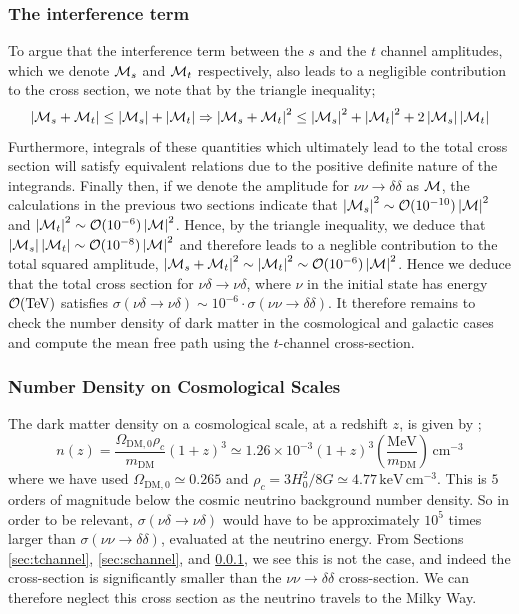 \subsubsection{The interference term}\label{sec:interference}
To argue that the interference term between the $s$ and the $t$ channel amplitudes, which we denote $\mathcal{M}_s$ and $\mathcal{M}_t$ respectively, also leads to a negligible contribution to the cross section, we note that by the triangle inequality;
\begin{equation}
    \left|\mathcal{M}_s + \mathcal{M}_t\right| \leq \left|\mathcal{M}_s\right| + \left|\mathcal{M}_t\right| \Rightarrow \left|\mathcal{M}_s + \mathcal{M}_t\right|^2 \leq \left|\mathcal{M}_s\right|^2 + \left|\mathcal{M}_t\right|^2 + 2\left|\mathcal{M}_s\right|\left|\mathcal{M}_t\right|
\end{equation}
Furthermore, integrals of these quantities which ultimately lead to the total cross section will satisfy equivalent relations due to the positive definite nature of the integrands. Finally then, if we denote the amplitude for $\nu\nu \rightarrow \delta\delta$ as $\mathcal{M}$, the calculations in the previous two sections indicate that $\left|\mathcal{M}_s\right|^2 \sim \mathcal{O}(10^{-10})\left|\mathcal{M}\right|^2$ and $\left|\mathcal{M}_t\right|^2 \sim \mathcal{O}(10^{-6})\left|\mathcal{M}\right|^2$. Hence, by the triangle inequality, we deduce that $\left|\mathcal{M}_s\right|\left|\mathcal{M}_t\right| \sim \mathcal{O}(10^{-8})\left|\mathcal{M}\right|^2$ and therefore leads to a neglible contribution to the total squared amplitude, $\left|\mathcal{M}_s + \mathcal{M}_t\right|^2 \sim \left|\mathcal{M}_t\right|^2 \sim \mathcal{O}(10^{-6})\left|\mathcal{M}\right|^2$. Hence we deduce that the total cross section for $\nu\delta \rightarrow \nu\delta$, where $\nu$ in the initial state has energy $\mathcal{O}(\mathrm{TeV})$ satisfies $\sigma(\nu\delta \rightarrow \nu\delta) \sim 10^{-6} \cdot \sigma(\nu\nu\rightarrow \delta\delta)$. It therefore remains to check the number density of dark matter in the cosmological and galactic cases and compute the mean free path using the $t$-channel cross-section.

\subsubsection{Number Density on Cosmological Scales}
The dark matter density on a cosmological scale, at a redshift $z$, is given by \cite{Farzan2014};
\begin{equation}
  n(z) = \frac{\Omega_{\textrm{DM},0}\rho_c}{m_{\textrm{DM}}}(1 + z)^3 \simeq 1.26 \times 10^{-3} (1 + z)^3 \left(\frac{\textrm{MeV}}{m_{\textrm{DM}}}\right) \, \textrm{cm}^{-3}
\end{equation}
where we have used $\Omega_{\textrm{DM},0} \simeq 0.265$ and $\rho_c = 3H_0^2/8G \simeq 4.77\, \textrm{keV}\,\textrm{cm}^{-3}$. This is $5$ orders of magnitude below the cosmic neutrino background number density. So in order to be relevant, $\sigma(\nu\delta \rightarrow \nu\delta)$ would have to be approximately $10^5$ times larger than $\sigma(\nu\nu \rightarrow \delta\delta)$, evaluated at the neutrino energy. From Sections \ref{sec:tchannel}, \ref{sec:schannel}, and \ref{sec:interference}, we see this is not the case, and indeed the cross-section is significantly smaller than the $\nu\nu \rightarrow \delta\delta$ cross-section.  We can therefore neglect this cross section as the neutrino travels to the Milky Way.

